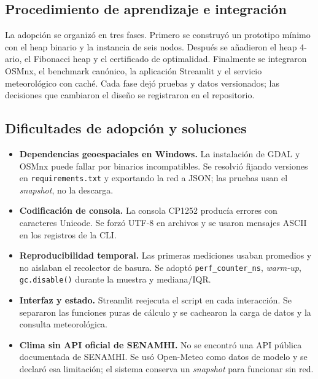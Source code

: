 \subsection{Procedimiento de aprendizaje e integración}
La adopción se organizó en tres fases. Primero se construyó un prototipo mínimo con el heap binario y la instancia de seis nodos. Después se añadieron el heap 4-ario, el Fibonacci heap y el certificado de optimalidad. Finalmente se integraron OSMnx, el benchmark canónico, la aplicación Streamlit y el servicio meteorológico con caché. Cada fase dejó pruebas y datos versionados; las decisiones que cambiaron el diseño se registraron en el repositorio.

\subsection{Dificultades de adopción y soluciones}
\begin{itemize}
    \item \textbf{Dependencias geoespaciales en Windows.} La instalación de GDAL y OSMnx puede fallar por binarios incompatibles. Se resolvió fijando versiones en \texttt{requirements.txt} y exportando la red a JSON; las pruebas usan el \textit{snapshot}, no la descarga.
    \item \textbf{Codificación de consola.} La consola CP1252 producía errores con caracteres Unicode. Se forzó UTF-8 en archivos y se usaron mensajes ASCII en los registros de la CLI.
    \item \textbf{Reproducibilidad temporal.} Las primeras mediciones usaban promedios y no aislaban el recolector de basura. Se adoptó \texttt{perf\_counter\_ns}, \textit{warm-up}, \texttt{gc.disable()} durante la muestra y mediana/IQR.
    \item \textbf{Interfaz y estado.} Streamlit reejecuta el script en cada interacción. Se separaron las funciones puras de cálculo y se cachearon la carga de datos y la consulta meteorológica.
    \item \textbf{Clima sin API oficial de SENAMHI.} No se encontró una API pública documentada de SENAMHI. Se usó Open-Meteo como datos de modelo y se declaró esa limitación; el sistema conserva un \textit{snapshot} para funcionar sin red.
\end{itemize}
